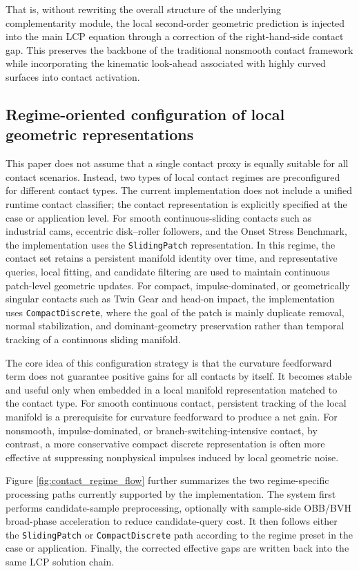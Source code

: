 That is, without rewriting the overall structure of the underlying complementarity module, the local second-order geometric prediction is injected into the main LCP equation through a correction of the right-hand-side contact gap. This preserves the backbone of the traditional nonsmooth contact framework while incorporating the kinematic look-ahead associated with highly curved surfaces into contact activation.

\subsection{Regime-oriented configuration of local geometric representations}
This paper does not assume that a single contact proxy is equally suitable for all contact scenarios. Instead, two types of local contact regimes are preconfigured for different contact types. The current implementation does not include a unified runtime contact classifier; the contact representation is explicitly specified at the case or application level. For smooth continuous-sliding contacts such as industrial cams, eccentric disk--roller followers, and the Onset Stress Benchmark, the implementation uses the \texttt{SlidingPatch} representation. In this regime, the contact set retains a persistent manifold identity over time, and representative queries, local fitting, and candidate filtering are used to maintain continuous patch-level geometric updates. For compact, impulse-dominated, or geometrically singular contacts such as Twin Gear and head-on impact, the implementation uses \texttt{CompactDiscrete}, where the goal of the patch is mainly duplicate removal, normal stabilization, and dominant-geometry preservation rather than temporal tracking of a continuous sliding manifold.

The core idea of this configuration strategy is that the curvature feedforward term does not guarantee positive gains for all contacts by itself. It becomes stable and useful only when embedded in a local manifold representation matched to the contact type. For smooth continuous contact, persistent tracking of the local manifold is a prerequisite for curvature feedforward to produce a net gain. For nonsmooth, impulse-dominated, or branch-switching-intensive contact, by contrast, a more conservative compact discrete representation is often more effective at suppressing nonphysical impulses induced by local geometric noise.

Figure \ref{fig:contact_regime_flow} further summarizes the two regime-specific processing paths currently supported by the implementation. The system first performs candidate-sample preprocessing, optionally with sample-side OBB/BVH broad-phase acceleration to reduce candidate-query cost. It then follows either the \texttt{SlidingPatch} or \texttt{CompactDiscrete} path according to the regime preset in the case or application. Finally, the corrected effective gaps are written back into the same LCP solution chain.

